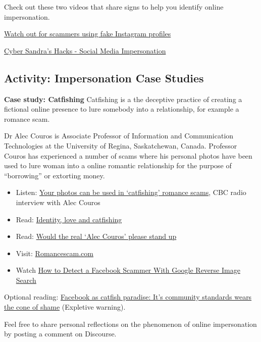 \documentclass[
]{book}
\providecommand{\tightlist}{%
  \setlength{\itemsep}{0pt}\setlength{\parskip}{0pt}}
\theoremstyle{definition}
\theoremstyle{definition}
\theoremstyle{definition}
\theoremstyle{definition}
\theoremstyle{remark}
\begin{document}
\begin{reflect}
Check out these two videos that share signs to help you identify online impersonation.

\href{https://www.youtube.com/watch?v=F57DE05FpgQ}{Watch out for scammers using fake Instagram profiles}

\href{https://www.youtube.com/watch?v=Ta6qq7wnpcA}{Cyber Sandra's Hacks - Social Media Impersonation}

\hypertarget{activity-impersonation-case-studies}{%
\subsection*{Activity: Impersonation Case Studies}\label{activity-impersonation-case-studies}}
\end{reflect}
\begin{reflect}
\textbf{Case study: Catfishing}
Catfishing is a the deceptive practice of creating a fictional online presence to lure somebody into a relationship, for example a romance scam.

Dr Alec Couros is Associate Professor of Information and Communication Technologies at the University of Regina, Saskatchewan, Canada. Professor Couros has experienced a number of scams where his personal photos have been used to lure woman into a online romantic relationship for the purpose of ``borrowing'' or extorting money.

\begin{itemize}
\tightlist
\item
  Listen: \href{https://www.cbc.ca/radio/spark/380-phantom-traffic-jams-catfishing-scams-and-smart-speakers-1.4482967/your-photos-can-be-used-in-catfishing-romance-scams-1.4482985}{Your photos can be used in `catfishing' romance scams}, CBC radio interview with Alec Couros\\
\item
  Read: \href{http://educationaltechnology.ca/2393/}{Identity, love and catfishing}\\
\item
  Read: \href{http://educationaltechnology.ca/2466/}{Would the real `Alec Couros' please stand up}\\
\item
  Visit: \href{https://romancescam.com/}{Romancescam.com}\\
\item
  Watch \href{https://www.youtube.com/watch?v=s6Q4U8DvJH8}{How to Detect a Facebook Scammer With Google Reverse Image Search}
\end{itemize}

Optional reading: \href{https://cogdogblog.com/2015/10/facebook-as-catfish-paradise-its-community-standards-wears-the-cone-of-shame/}{Facebook as catfish paradise: It's community standards wears the cone of shame} (Expletive warning).

Feel free to share personal reflections on the phenomenon of online impersonation by posting a comment on Discourse.
\end{reflect}
\end{document}

